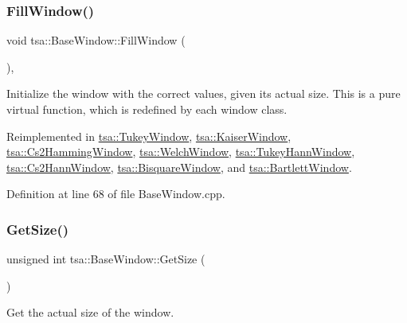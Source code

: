 \subsubsection{\texorpdfstring{Fill\+Window()}{FillWindow()}}
{\footnotesize\ttfamily void tsa\+::\+Base\+Window\+::\+Fill\+Window (\begin{DoxyParamCaption}{ }\end{DoxyParamCaption})\hspace{0.3cm}{\ttfamily [protected]}, {\ttfamily [virtual]}}

Initialize the window with the correct values, given its actual size. This is a pure virtual function, which is redefined by each window class. 

Reimplemented in \hyperlink{classtsa_1_1_tukey_window_a9c44b527df2c303511322face00a5d33}{tsa\+::\+Tukey\+Window}, \hyperlink{classtsa_1_1_kaiser_window_a4799ed39290a058eea9d44df73f764ea}{tsa\+::\+Kaiser\+Window}, \hyperlink{classtsa_1_1_cs2_hamming_window_a269a092db403a2bd7bb93456dc39be60}{tsa\+::\+Cs2\+Hamming\+Window}, \hyperlink{classtsa_1_1_welch_window_aa5dd01231aa4a33fb43473209a679309}{tsa\+::\+Welch\+Window}, \hyperlink{classtsa_1_1_tukey_hann_window_a041a98810aa841fd88d19139bf0e977f}{tsa\+::\+Tukey\+Hann\+Window}, \hyperlink{classtsa_1_1_cs2_hann_window_a0da151916492d8ab9504ee40872131a2}{tsa\+::\+Cs2\+Hann\+Window}, \hyperlink{classtsa_1_1_bisquare_window_a62ab3bab83dd4dd77090c7c49be24acb}{tsa\+::\+Bisquare\+Window}, and \hyperlink{classtsa_1_1_bartlett_window_afb3c6c8aa249db673da8dd625ffbb8a5}{tsa\+::\+Bartlett\+Window}.



Definition at line 68 of file Base\+Window.\+cpp.

\mbox{\label{classtsa_1_1_base_window_af3e45daf0401f06108c6634344532af8}} 
\subsubsection{\texorpdfstring{Get\+Size()}{GetSize()}}
{\footnotesize\ttfamily unsigned int tsa\+::\+Base\+Window\+::\+Get\+Size (\begin{DoxyParamCaption}{ }\end{DoxyParamCaption})}

Get the actual size of the window.

